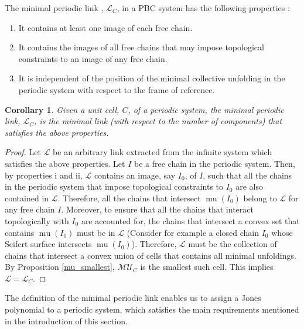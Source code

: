 \documentclass{article}
\newtheorem{corollary}{Corollary}[section]
\begin{document}
\noindent The minimal periodic link , $\mathcal{L}_C$, in a PBC system has the following properties :
\begin{enumerate}
    \item It contains at least one image of each free chain.
    \item It contains the images of all free chains  that may impose topological constraints to an image of any free chain.
    \item It is independent of the position of the minimal collective unfolding in the periodic system with respect to the frame of reference.
\end{enumerate}  

\begin{corollary}
    Given a unit cell, $C$, of a periodic system, the minimal periodic link, $\mathcal{L}_C$, is the minimal link (with respect to the number of components) that satisfies the above properties.
\end{corollary}
\begin{proof}
      Let $\mathcal{L}$ be an arbitrary link extracted from the infinite system which satisfies the above properties.  Let $I$ be a free chain in the periodic system. Then, by properties i and ii,  $\mathcal{L}$ contains an image, say $I_0$, of $I$, such that all the chains in the periodic system that impose topological constraints to $I_0$ are also contained in  $\mathcal{L}$. Therefore, all the chains that intersect $\operatorname{mu}(I_0)$ belong to $\mathcal{L}$ for any free chain $I$. Moreover, to ensure that all the chains that interact topologically with $I_0$ are accounted for, the chains that intersect a convex set that contains $\operatorname{mu}(I_0)$ must be in $\mathcal{L}$ (Consider for example a closed chain $I_0$ whose Seifert surface intersects $\operatorname{mu}(I_0)$).    Therefore,  $\mathcal{L}$ must be the collection of chains that intersect a convex union of cells that contains all minimal unfoldings. By Proposition \ref{mu_smallest}, $\mathcal{MU}_C$ is the smallest such cell. This implies $\mathcal{L}=\mathcal{L}_C$.
\end{proof}

The definition of the minimal periodic link enables us to assign a Jones polynomial to a periodic system, which satisfies the main requirements mentioned in the introduction of this section.
\end{document}
